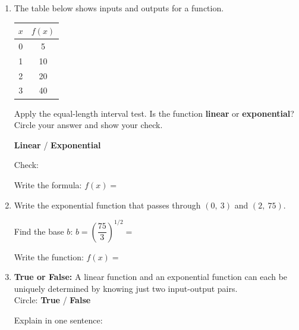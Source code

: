 \documentclass[10pt]{article}
\begin{document}
\namedateperiod

\vspace{0.14in}

\begin{enumerate}[itemsep=20pt]

\item The table below shows inputs and outputs for a function.

      \medskip
      \renewcommand{\arraystretch}{1.3}
      \begin{tabular}{c|c}
        $x$ & $f(x)$ \\ \hline
        0 & 5 \\ 1 & 10 \\ 2 & 20 \\ 3 & 40
      \end{tabular}

      \medskip
      Apply the equal-length interval test. Is the function \textbf{linear} or \textbf{exponential}?
      Circle your answer and show your check.

      \vspace{0.08in}
      \textbf{Linear} \quad / \quad \textbf{Exponential}

      \vspace{0.08in}
      Check: \blank{8cm}

      \vspace{0.06in}
      Write the formula: $f(x) = $ \blank{6cm}

\item Write the exponential function that passes through $(0,\ 3)$ and $(2,\ 75)$.

      \vspace{0.08in}
      Find the base $b$: $b = \left(\dfrac{75}{3}\right)^{1/2} = $ \blank{3cm}

      \vspace{0.08in}
      Write the function: $f(x) = $ \blank{5cm}

\item \textbf{True or False:} A linear function and an exponential function can each be
      uniquely determined by knowing just two input-output pairs. \\[6pt]
      Circle: \quad \textbf{True} \quad / \quad \textbf{False}

      \vspace{0.06in}
      Explain in one sentence: \writeline

\end{enumerate}
\end{document}
